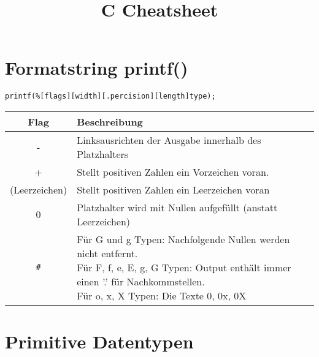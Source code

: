 \documentclass[a4paper,10pt]{article}
\title{C Cheatsheet}
\author{}
\date{}
\begin{document}
\maketitle
\section{Formatstring printf()}

\begin{lstlisting}
printf(%[flags][width][.percision][length]type);
\end{lstlisting} 

\begin{center}
        \begin{tabular}{|c|l|}
        \hline
            Flag   & Beschreibung\\
        \hline
            -               & Linksausrichten der Ausgabe innerhalb des Platzhalters\\
            +               & Stellt positiven Zahlen ein Vorzeichen voran.\\
            (Leerzeichen)   & Stellt positiven Zahlen ein Leerzeichen voran\\
            0               & Platzhalter wird mit Nullen aufgefüllt (anstatt Leerzeichen)\\
            \verb|#|        & \makecell[l]{ Für G und g Typen: Nachfolgende Nullen werden nicht entfernt.\\
                            Für F, f, e, E, g, G Typen: Output enthält immer einen '.' für Nachkommstellen.\\
                            Für o, x, X Typen: Die Texte 0, 0x, 0X }\\ 
        \hline
        \end{tabular}
    \end{center}
\section{Primitive Datentypen}
\end{document}
